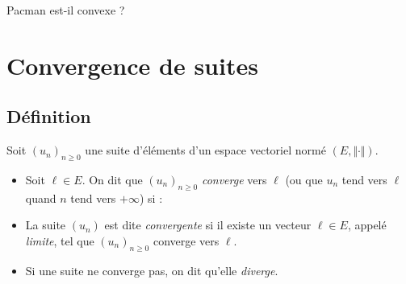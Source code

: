 \documentclass[french,11pt,twoside]{VcCours}
\begin{document}
\vspace{6cm}
%

\begin{ApplicationDirecte} Pacman est-il convexe ?
\end{ApplicationDirecte} 

\section{Convergence de suites}
\subsection{Définition}
\begin{Definition}{} Soit $(u_n)_{n \geq 0}$ une suite d'éléments d'un espace vectoriel normé $(E, \Vert \cdot \Vert)$.

\begin{itemize}
\item Soit $\ell \in E$. On dit que $(u_n)_{ n\geq 0}$ \emph{converge} vers $\ell$ (ou que $u_n$ tend vers $\ell$ quand $n$ tend vers $+ \infty$) si :

\vspace{1cm}

\item La suite $(u_n)$ est dite \emph{convergente} si il existe un vecteur $\ell \in E$, appelé \emph{limite}, tel que $(u_n)_{n \geq 0}$ converge vers $\ell$.
\item Si une suite ne converge pas, on dit qu'elle \emph{diverge}.
\end{itemize}
\end{Definition}
\end{document}
